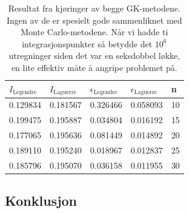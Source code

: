 \documentclass[norsk, 10pt]{article}
\begin{document}
\begin{table}[H]
  \centering
  \begin{tabular}{ l l l l l}
    \toprule
    $I_{\text{Legendre}}$ & $I_{\text{Laguerre}}$ & $\epsilon_{\text{Legendre}}$ & $\epsilon_{\text{Laguerre}}$ & n \\
    \midrule
	0.129834 & 0.181567 & 0.326466 & 0.058093 & 10 \\
	0.199475 & 0.195887 & 0.034804 & 0.016192 & 15 \\
	0.177065 & 0.195636 & 0.081449 & 0.014892 & 20 \\
	0.189110 & 0.195240 & 0.018967 & 0.012837 & 25 \\
	0.185796 & 0.195070 & 0.036158 & 0.011955 & 30 \\
	\bottomrule
  \end{tabular}
  \caption{Resultat fra kjøringer av begge GK-metodene. Ingen av de er spesielt gode sammenliknet med Monte Carlo-metodene. Når vi hadde ti integrasjonspunkter så betydde det $10^6$ utregninger siden det var en seksdobbel løkke, en lite effektiv måte å angripe problemet på.}
  \label{tab:gauleg}
\end{table}


\subsection*{Konklusjon}
\end{document}
